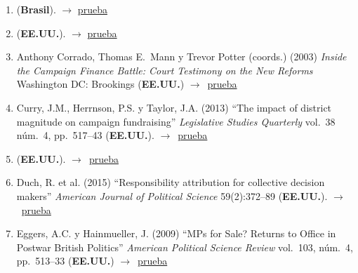 \documentclass[12 pt, letter]{article}
\newenvironment{CitasMiTrabajo}{
    \begin{footnotesize}
    \begin{enumerate}[label={\footnotesize\emph{cita~\arabic*}},ref=\arabic*] %
        \setlength{\itemsep}{.1\itemsep}
        \setlength{\parskip}{.1\parskip}
    }{\end{enumerate}\end{footnotesize}}
\begin{document}
\begin{CitasMiTrabajo}
        \item {} (\textbf{Brasil}). $\rightarrow$ \href{https://github.com/emagar/cv/blob/master/citasMiTrab/coxMagar/castroAccountBrasil2014opPub.pdf}{prueba}

       \item {} (\textbf{EE.UU.}).  $\rightarrow$ \href{https://www.semanticscholar.org/paper/Earmarks-and-Subcommittee-Government-in-the-U.S.-Clemens-Crespin/b68f98a353ceca61ac12fc0ace04a09982314050}{prueba}
         
      \item Anthony Corrado, Thomas E.\ Mann y Trevor Potter (coords.) (2003) \emph{Inside the Campaign Finance Battle: Court Testimony on the New Reforms} Washington DC: Brookings (\textbf{EE.UU.}) $\rightarrow$~\href{https://books.google.com.mx/books?hl=en&lr=&id=akTNXf9dVHgC&oi=fnd&pg=PR9&dq=Inside+the+Campaign+Finance+Battle&ots=1XwFv815e6&sig=hcdqq8nASqb8d2zROLoSnmJHDD4&redir_esc=y#v=onepage&q=magar&f=false}{prueba} 
        
        \item Curry, J.M., Herrnson, P.S. y Taylor, J.A. (2013)
        ``The impact of district magnitude on campaign fundraising''
        \emph{Legislative Studies Quarterly} vol.\ 38 n\'um.\ 4, pp.\ 517--43 (\textbf{EE.UU.}). $\rightarrow$~\href{https://github.com/emagar/cv/blob/master/citasMiTrab/coxMagar/curryEtAl2013lsq.excerpts.pdf}{prueba}

      \item {} (\textbf{EE.UU.}).  $\rightarrow$~\href{https://books.google.com.mx/books?hl=en&lr=&id=Y_hJCgAAQBAJ&oi=fnd&pg=PR7&dq=Legislating+in+the+Dark&ots=suGYfOS7yS&sig=OKV-ykL-RaBMmfdwW6vkSRrfGQM&redir_esc=y#v=onepage&q=magar&f=false}{prueba}
        
        \item Duch, R. et al. (2015) ``Responsibility attribution for collective decision makers'' \emph{American Journal of Political Science} 59(2):372--89 (\textbf{EE.UU.}). $\rightarrow$~\href{https://github.com/emagar/cv/blob/master/citasMiTrab/coxMagar/duch.etalAttribution2015ajps.pdf}{prueba}

        \item Eggers, A.C. y Hainmueller, J. (2009)
        ``MPs for Sale? Returns to Office in Postwar British Politics''
        \emph{American Political Science Review} vol.\ 103, n\'um.\ 4, pp.\ 513--33  (\textbf{EE.UU.}) $\rightarrow$~\href{https://github.com/emagar/cv/blob/master/citasMiTrab/coxMagar/eggers.pdf}{prueba}


\end{CitasMiTrabajo}
\end{document}
